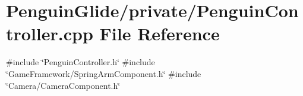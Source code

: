 \section{Penguin\+Glide/private/\+Penguin\+Controller.cpp File Reference}
\label{_penguin_controller_8cpp}
{\ttfamily \#include \char`\"{}Penguin\+Controller.\+h\char`\"{}}\newline
{\ttfamily \#include \char`\"{}Game\+Framework/\+Spring\+Arm\+Component.\+h\char`\"{}}\newline
{\ttfamily \#include \char`\"{}Camera/\+Camera\+Component.\+h\char`\"{}}\newline
